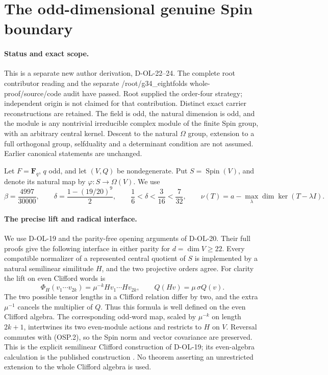 \section{The odd-dimensional genuine Spin boundary}
\label{sec:spin-odd-extension}

\paragraph{Status and exact scope.}
This is a separate new author derivation, D-OL-22--24.
The complete root contributor reading and the separate
/root/g34\_eightfolds whole-proof/source/code audit have passed.
Root supplied the order-four strategy; independent origin is not claimed
for that contribution. Distinct exact carrier reconstructions are retained.  The field is odd,
the natural dimension is odd, and the module is any nontrivial
irreducible complex module of the finite Spin group, with an
arbitrary central kernel.  Descent to the natural $\Omega$ group,
extension to a full orthogonal group, selfduality and a determinant
condition are not assumed.  Earlier canonical statements are unchanged.

Let $F=\mathbf F_q$, $q$ odd, and let $(V,Q)$ be nondegenerate.
Put $S=\operatorname{Spin}(V)$, and denote its natural map by
$\varphi:S\longrightarrow\Omega(V)$.  We use
\[
 \beta=\frac{4997}{30000},\qquad
 \delta=\frac{1-(19/20)^9}{2},\qquad
 \frac16<\delta<\frac3{16}<\frac7{32},
 \qquad \nu(T)=a-\max_\lambda\dim\ker(T-\lambda I).
 \tag{OSP.1}
\]

\paragraph{The precise lift and radical interface.}
We use D-OL-19 and the parity-free opening arguments of D-OL-20.
Their full proofs give the following interface in either parity
for $d=\dim V\ge22$.  Every compatible normalizer of a represented
central quotient of $S$ is implemented by a natural semilinear
similitude $H$, and the two projective orders agree.
For clarity the lift on even Clifford words is
\[
 \Phi_H(v_1\cdots v_{2k})
       =\mu^{-k}Hv_1\cdots Hv_{2k},
 \qquad Q(Hv)=\mu\,\sigma Q(v).                              \tag{OSP.2}
\]
The two possible tensor lengths in a Clifford relation differ by
two, and the extra $\mu^{-1}$ cancels the multiplier of $Q$.
Thus this formula is well defined on the even Clifford algebra.
The corresponding odd-word map, scaled by $\mu^{-k}$ on length
$2k+1$, intertwines its two even-module actions and restricts to
$H$ on $V$.  Reversal commutes with (OSP.2), so the Spin norm
and vector covariance are preserved.  This is the explicit
semilinear Clifford construction of D-OL-19; its even-algebra
calculation is the published construction
\cite[Part II, pp.~48--49]{SF:Wonenburger1962}.
No theorem asserting an unrestricted extension to the whole
Clifford algebra is used.

